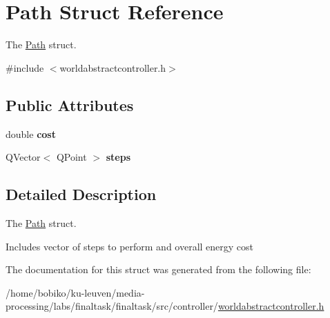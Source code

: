 \hypertarget{structPath}{}\section{Path Struct Reference}
\label{structPath}


The \hyperlink{structPath}{Path} struct.  




{\ttfamily \#include $<$worldabstractcontroller.\+h$>$}

\subsection*{Public Attributes}
\begin{DoxyCompactItemize}
\item 
double {\bfseries cost}\hypertarget{structPath_a4d54acc172b9690ba67bebec88c9d2c6}{}\label{structPath_a4d54acc172b9690ba67bebec88c9d2c6}

\item 
Q\+Vector$<$ Q\+Point $>$ {\bfseries steps}\hypertarget{structPath_a4be65f498114d6bf65f8934c2bb180eb}{}\label{structPath_a4be65f498114d6bf65f8934c2bb180eb}

\end{DoxyCompactItemize}


\subsection{Detailed Description}
The \hyperlink{structPath}{Path} struct. 

Includes vector of steps to perform and overall energy cost 

The documentation for this struct was generated from the following file\+:\begin{DoxyCompactItemize}
\item 
/home/bobiko/ku-\/leuven/media-\/processing/labs/finaltask/finaltask/src/controller/\hyperlink{worldabstractcontroller_8h}{worldabstractcontroller.\+h}\end{DoxyCompactItemize}
